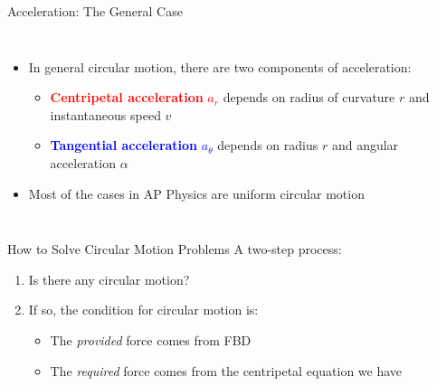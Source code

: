 \documentclass[12pt,compress,aspectratio=169]{beamer}
\newcommand{\mb}[1]{\ensuremath\mathbf{#1}}
\newcommand{\eq}[2]{\vspace{#1}{\Large\begin{displaymath}#2\end{displaymath}}}
\begin{document}
\begin{frame}{Acceleration: The General Case}
  \begin{columns}
    
    \begin{itemize}
    \item In general circular motion, there are two components of acceleration:
      \begin{itemize}
      \item\textcolor{red}{\textbf{Centripetal acceleration} $a_r$} depends on
        radius of curvature $r$ and instantaneous speed $v$
      \item \textcolor{blue}{\textbf{Tangential acceleration} $a_\theta$}
        depends on radius $r$  and angular acceleration $\alpha$
      \end{itemize}
    \item Most of the cases in AP Physics are uniform circular motion
    \end{itemize}
  \end{columns}
\end{frame}


\begin{frame}{How to Solve Circular Motion Problems}
  A two-step process:
  \begin{enumerate}
  \item Is there any circular motion?
  \item If so, the condition for circular motion is:

    \eq{-.2in}{
      \mb{F}_\mathrm{provided}=\mb{F}_\mathrm{required}
    }
    \begin{itemize}
    \item The \emph{provided} force comes from FBD
    \item The \emph{required} force comes from the centripetal equation we have
    \end{itemize}
  \end{enumerate}
\end{frame}
\end{document}
